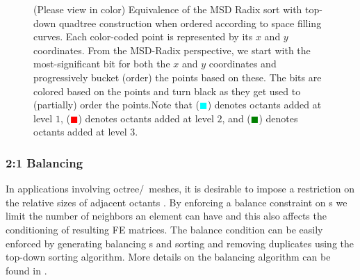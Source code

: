 \begin{figure}
	\caption{\label{fig:cons} \small (Please view in color) Equivalence of the MSD Radix sort with top-down quadtree construction when ordered according to space filling curves. Each color-coded point is represented by its $x$ and $y$ coordinates. From the MSD-Radix perspective, we start with the most-significant bit for both the $x$ and $y$ coordinates and progressively bucket (order) the points based on these. The bits are colored based on the points and turn black as they get used to (partially) order the points.Note that (\textcolor{cyan}{$\blacksquare$}) denotes octants added at level $1$, (\textcolor{red}{$\blacksquare$}) denotes octants added at level $2$, and (\textcolor{green}{$\blacksquare$}) denotes octants added at level $3$.}
\end{figure}

\subsubsection{2:1 Balancing}

In applications involving octree/\stri\ meshes, it is desirable to impose a restriction on the relative sizes of adjacent octants \cite{SundarSampathAdavaniEtAl07,BursteddeWilcoxGhattas11}. By enforcing a balance constraint on \stri s we limit the number of neighbors an element can have and this also affects the conditioning of resulting FE matrices. The balance condition can be easily enforced by generating balancing \stra s and sorting and removing duplicates using the top-down sorting algorithm. More details on the balancing algorithm can be found in \cite{SundarSampathAdavaniEtAl07,SundarSampathBiros08,FernandoDuplyakinSundar17}. 

